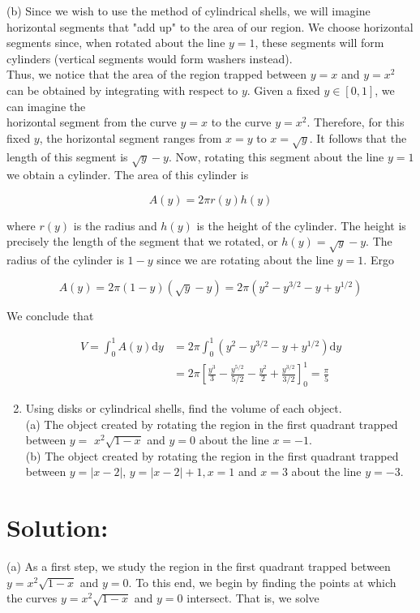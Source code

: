 \documentclass[10pt]{article}
\begin{document}
(b) Since we wish to use the method of cylindrical shells, we will imagine horizontal segments that "add up" to the area of our region. We choose horizontal segments since, when rotated about the line $y=1$, these segments will form cylinders (vertical segments would form washers instead).\\
Thus, we notice that the area of the region trapped between $y=x$ and $y=x^{2}$ can be obtained by integrating with respect to $y$. Given a fixed $y \in[0,1]$, we can imagine the\\
horizontal segment from the curve $y=x$ to the curve $y=x^{2}$. Therefore, for this fixed $y$, the horizontal segment ranges from $x=y$ to $x=\sqrt{y}$. It follows that the length of this segment is $\sqrt{y}-y$. Now, rotating this segment about the line $y=1$ we obtain a cylinder. The area of this cylinder is

$$
A(y)=2 \pi r(y) h(y)
$$

where $r(y)$ is the radius and $h(y)$ is the height of the cylinder. The height is precisely the length of the segment that we rotated, or $h(y)=\sqrt{y}-y$. The radius of the cylinder is $1-y$ since we are rotating about the line $y=1$. Ergo

$$
A(y)=2 \pi(1-y)(\sqrt{y}-y)=2 \pi\left(y^{2}-y^{3 / 2}-y+y^{1 / 2}\right)
$$

We conclude that

$$
\begin{aligned}
V=\int_{0}^{1} A(y) \mathrm{d} y & =2 \pi \int_{0}^{1}\left(y^{2}-y^{3 / 2}-y+y^{1 / 2}\right) \mathrm{d} y \\
& =2 \pi\left[\frac{y^{3}}{3}-\frac{y^{5 / 2}}{5 / 2}-\frac{y^{2}}{2}+\frac{y^{3 / 2}}{3 / 2}\right]_{0}^{1}=\frac{\pi}{5}
\end{aligned}
$$

\begin{enumerate}
  \setcounter{enumi}{1}
  \item Using disks or cylindrical shells, find the volume of each object.\\
(a) The object created by rotating the region in the first quadrant trapped between $y=$ $x^{2} \sqrt{1-x}$ and $y=0$ about the line $x=-1$.\\
(b) The object created by rotating the region in the first quadrant trapped between $y=|x-2|$, $y=|x-2|+1, x=1$ and $x=3$ about the line $y=-3$.
\end{enumerate}

\section*{Solution:}
(a) As a first step, we study the region in the first quadrant trapped between $y=x^{2} \sqrt{1-x}$ and $y=0$. To this end, we begin by finding the points at which the curves $y=x^{2} \sqrt{1-x}$ and $y=0$ intersect. That is, we solve
\end{document}
